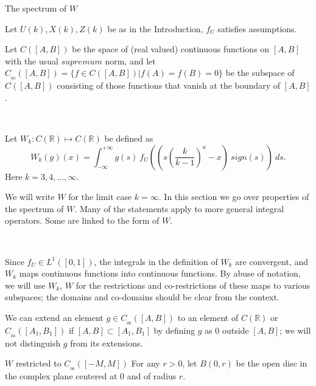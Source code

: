 \documentclass[12pt]{article}
\newenvironment{definition}[1][Definition]{\begin{trivlist}
		\item[\hskip \labelsep {\bfseries #1}]}{\end{trivlist}}
\begin{document}


\begin{section}{The spectrum of $W$ }  
	
	Let $U(k),X(k),Z(k)$ be as in the Introduction, $f_U$ satisfies assumptions.  
	
	\begin{definition} Let $C([A,B])$ be the space of (real valued) continuous functions on $[A,B]$ with the usual $supremum$ norm, and let $C_{_{0\!0}}([A,B]) = \{f \in C([A,B]) | f(A)=f(B) = 0\}$ be the subspace of $C([A,B])$ consisting of those functions that vanish at the boundary of $[A,B]$. 
		
	\  
		
	Let $W_k: C(\mathbb{R}) \longmapsto C(\mathbb{R})$ be defined as
	\begin{equation} \label{eq:Wk}
	W_k(g)(x) = \int_{-\infty}^{+\infty} g(s)\ f_U\!\left(  \left(s \left(\frac{k}{k-1}\right)^a - x \right)\ sign(s) \right) \ ds.
	\end{equation}
	Here $k=3,4,\dots, \infty$.   
	
	We will write $W$ for the limit case $k=\infty$. In this section we go over properties of the spectrum of $W$. Many of the statements apply to more general integral operators. Some are linked to the form of $W$.
	
	\
	
	Since $f_U \in L^1([0,1])$, the integrals in the definition of $W_k$ are convergent, and $W_k$ maps continuous functions into continuous functions. By abuse of notation, we will use $W_k$, $W$ for the restrictions and co-restrictions of these maps to various subspaces; the domains and co-domains should be clear from the context.  
	
	We can extend an element $g \in C_{_{0\!0}}([A,B])$ to an element of $C(\mathbb{R})$ or $C_{_{00}}([A_1,B_1])$ if $[A,B] \subset [A_1,B_1]$ by defining $g$ as $0$ outside $[A,B]$; we will not distinguish $g$ from its extensions.  
	
  
\end{definition}

\begin{subsection}{$W$ restricted to $C_{_{0\!0}}([-M,M])$}
	For any $r > 0$, let $B(0,r)$ be the open disc in the complex plane centered at $0$ and of radius $r$.  
	

\end{subsection}
\end{section}
\end{document}
